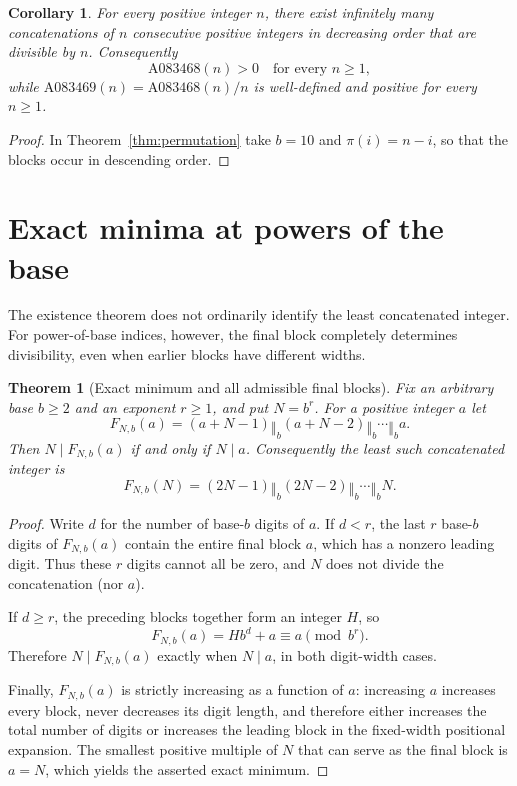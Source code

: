 \documentclass[11pt]{article}
\newtheorem{theorem}{Theorem}
\newtheorem{corollary}{Corollary}
\newcommand{\cat}{\mathbin{\Vert}}
\begin{document}
\begin{corollary}\label{cor:oeis}
For every positive integer $n$, there exist infinitely many
concatenations of $n$ consecutive positive integers in decreasing
order that are divisible by $n$. Consequently
\[
 \boxed{\mathrm{A083468}(n)>0\quad\text{for every }n\ge1,}
\]
while $\mathrm{A083469}(n)=\mathrm{A083468}(n)/n$ is
well-defined and positive for every $n\ge1$.
\end{corollary}
\begin{proof}
In Theorem~\ref{thm:permutation} take $b=10$ and
$\pi(i)=n-i$, so that the blocks occur in descending order.
\end{proof}
\section{Exact minima at powers of the base}\label{sec:minimum}
The existence theorem does not ordinarily identify the least concatenated
integer. For power-of-base indices, however, the final block completely
determines divisibility, even when earlier blocks have different widths.

\begin{theorem}[Exact minimum and all admissible final blocks]\label{thm:minimum}
Fix an arbitrary base $b\ge2$ and an exponent $r\ge1$, and put
$N=b^r$. For a positive integer $a$ let
\[
 F_{N,b}(a)=(a+N-1)\cat_b(a+N-2)\cat_b\cdots\cat_b a.
\]
Then $N\mid F_{N,b}(a)$ if and only if $N\mid a$.
Consequently the \emph{least} such concatenated integer is
\[
 F_{N,b}(N)=(2N-1)\cat_b(2N-2)\cat_b\cdots\cat_b N.
\]
\end{theorem}
\begin{proof}
Write $d$ for the number of base-$b$ digits of $a$.
If $d<r$, the last $r$ base-$b$ digits of $F_{N,b}(a)$
contain the entire final block $a$, which has a nonzero leading digit.
Thus these $r$ digits cannot all be zero, and $N$ does not divide the
concatenation (nor $a$).

If $d\ge r$, the preceding blocks together form an integer $H$, so
\[
 F_{N,b}(a)=H b^d+a\equiv a\pmod {b^r}.
\]
Therefore $N\mid F_{N,b}(a)$ exactly when $N\mid a$, in
both digit-width cases.

Finally, $F_{N,b}(a)$ is strictly increasing as a function of $a$:
increasing $a$ increases every block, never decreases its digit
length, and therefore either increases the total number of digits or
increases the leading block in the fixed-width positional expansion.
The smallest positive multiple of $N$ that can serve as the final
block is $a=N$, which yields the asserted exact minimum.
\end{proof}
\end{document}
